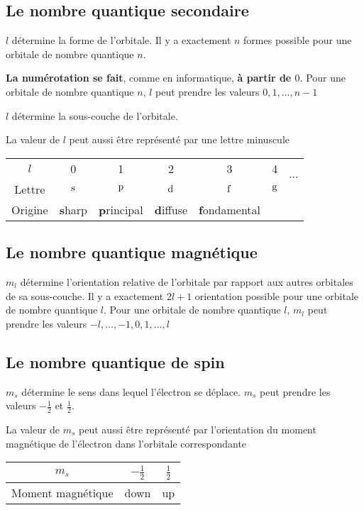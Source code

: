 \subsection{Le nombre quantique secondaire}
$l$ détermine la forme de l'orbitale.
Il y a exactement $n$ formes possible pour une orbitale de nombre quantique $n$.

{\bf La numérotation se fait}, comme en informatique, {\bf à partir de $0$}.
Pour une orbitale de nombre quantique $n$, $l$ peut prendre les valeurs $0, 1, \ldots, n-1$

$l$ détermine la sous-couche de l'orbitale.

La valeur de $l$ peut aussi être représenté par une lettre minuscule

\begin{center}
  \begin{tabular}{c|cccccc}
    $l$ & 0 & 1 & 2 & 3 & 4 & \multirow{2}{*}{$\cdots$}\\
    \cline{1-6}
    Lettre & $\mathrm{s}$ & $\mathrm{p}$ & $\mathrm{d}$ & $\mathrm{f}$ & $\mathrm{g}$\\
    Origine & {\bf s}harp & {\bf p}rincipal & {\bf d}iffuse & {\bf f}ondamental
  \end{tabular}
\end{center}

\subsection{Le nombre quantique magnétique}
$m_l$ détermine l'orientation relative de l'orbitale par rapport aux autres orbitales de sa sous-couche.
Il y a exactement $2l + 1$ orientation possible pour une orbitale de nombre quantique $l$.
Pour une orbitale de nombre quantique $l$, $m_l$ peut prendre les valeurs $-l, \ldots, -1,  0, 1, \ldots, l$

\subsection{Le nombre quantique de spin}
$m_s$ détermine le sens dans lequel l'électron se déplace.
$m_s$ peut prendre les valeurs $-\frac{1}{2}$ et $\frac{1}{2}$.

La valeur de $m_s$ peut aussi être représenté par l'orientation du moment magnétique de l'électron dans l'orbitale correspondante
\begin{center}
  \begin{tabular}{c|cc}
    $m_s$ & $-\frac{1}{2}$ & $\frac{1}{2}$\\
    \hline
    Moment magnétique & down & up
  \end{tabular}
\end{center}

